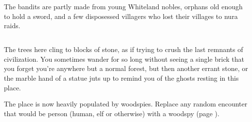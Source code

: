\begin{multicols}{2}


The bandits are partly made from young Whiteland nobles, orphans old enough to hold a sword, and a few disposessed villagers who lost their villages to nura raids.

\humansoldier

\subsection{}\label{lostcity}\setcounter{list}{0}

\begin{boxtext}

The trees here cling to blocks of stone, as if trying to crush the last remnants of civilization.  You sometimes wander for so long without seeing a single brick that you forget you're anywhere but a normal forest, but then another errant stone, or the marble hand of a statue juts up to remind you of the ghosts resting in this place.

\end{boxtext}

The place is now heavily populated by woodspies.  Replace any random encounter that would be person (human, elf or otherwise) with a woodspy (page \pageref{woodspy}).

\end{multicols}

\label{lost_city_map}

